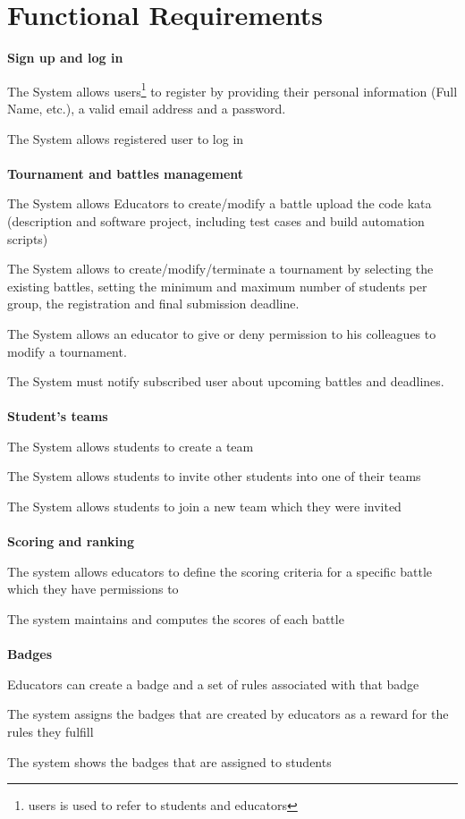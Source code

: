 \section{Functional Requirements}


\textbf{Sign up and log in}
\begin{enumerate}[label={[R\arabic*]}]
    
    \item The System allows users\footnote{users is used to refer to students and educators} to register by providing their personal information (Full Name, etc.), a valid email address and a password.
    \item The System allows registered user to log in
    \\  \\  \textbf{Tournament and battles management}
    \item The System allows Educators to create/modify a battle upload the code kata (description and software project, including test cases and build automation scripts)
    \item The System allows to create/modify/terminate a tournament by selecting the existing battles, setting the minimum and maximum number of students per group, the registration and final submission deadline.
    \item The System allows an educator to give or deny permission to his colleagues to modify a tournament.
    \item The System must notify subscribed user about upcoming battles and deadlines.
    \\  \\  \textbf{Student's teams}
    \item The System allows students to create a team
    \item The System allows students to invite other students into one of their teams
    \item The System allows students to join a new team which they were invited
    \\  \\  \textbf{Scoring and ranking}
    \item The system allows educators to define the scoring criteria for a specific battle which they have permissions to
    \item The system maintains and computes the scores of each battle
    \\ \\  \textbf{Badges}
    \item Educators can create a badge and a set of rules associated with that badge
    \item The system assigns the badges that are created by educators as a reward for the rules they fulfill
    \item The system shows the badges that are assigned to students


\end{enumerate}
